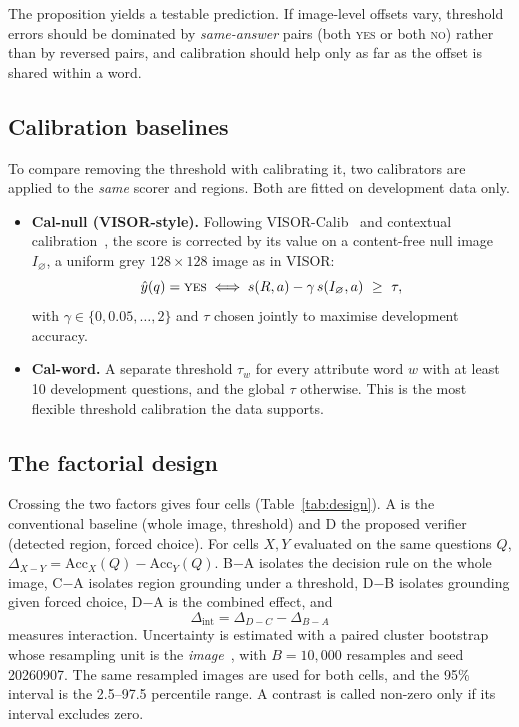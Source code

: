 \documentclass[11pt]{article}
\newcommand{\yes}{\textsc{yes}}
\newcommand{\no}{\textsc{no}}
\begin{document}
The proposition yields a testable prediction. If image-level offsets vary, threshold errors should be dominated by \emph{same-answer} pairs (both \yes{} or both \no) rather than by reversed pairs, and calibration should help only as far as the offset is shared within a word.

\subsection{Calibration baselines}\label{sec:calibdef}
To compare removing the threshold with calibrating it, two calibrators are applied to the \emph{same} scorer and regions. Both are fitted on development data only.
\begin{itemize}[leftmargin=*]
\item \textbf{Cal-null (VISOR-style).} Following VISOR-Calib~\cite{zhang2026visor} and contextual calibration~\cite{zhao2021calibrate}, the score is corrected by its value on a content-free null image $I_{\varnothing}$, a uniform grey $128\times128$ image as in VISOR:
\begin{equation}
\hat y(q)=\yes \iff s(R,a)-\gamma\, s(I_{\varnothing},a)\ \ge\ \tau ,
\label{eq:calnull}
\end{equation}
with $\gamma\in\{0,0.05,\dots,2\}$ and $\tau$ chosen jointly to maximise development accuracy.
\item \textbf{Cal-word.} A separate threshold $\tau_w$ for every attribute word $w$ with at least 10 development questions, and the global $\tau$ otherwise. This is the most flexible threshold calibration the data supports.
\end{itemize}

\subsection{The factorial design}
Crossing the two factors gives four cells (Table~\ref{tab:design}). A is the conventional baseline (whole image, threshold) and D the proposed verifier (detected region, forced choice). For cells $X,Y$ evaluated on the same questions $Q$, $\Delta_{X-Y}=\mathrm{Acc}_X(Q)-\mathrm{Acc}_Y(Q)$. B$-$A isolates the decision rule on the whole image, C$-$A isolates region grounding under a threshold, D$-$B isolates grounding given forced choice, D$-$A is the combined effect, and
\begin{equation}
\Delta_{\mathrm{int}}=\Delta_{D-C}-\Delta_{B-A}
\label{eq:interaction}
\end{equation}
measures interaction. Uncertainty is estimated with a paired cluster bootstrap whose resampling unit is the \emph{image}~\cite{efron1979bootstrap,field2007clustered}, with $B=10{,}000$ resamples and seed 20260907. The same resampled images are used for both cells, and the 95\% interval is the 2.5--97.5 percentile range. A contrast is called non-zero only if its interval excludes zero.
\end{document}

